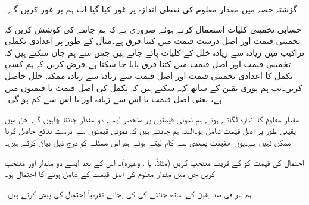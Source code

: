 گزشتہ حصہ میں مقدار معلوم کی نقطی اندازہ پر غور کیا گیا۔اب ہم  پر غور کریں گے۔

حسابی تخمینی کلیات استعمال کرتے ہوئے ضروری ہے کہ ہم جاننے کی کوشش کریں کہ  تخمینی قیمت اور اصل درست قیمت میں کتنا فرق ہے۔مثال کے طور پر اعدادی تکملی تراکیب میں زیادہ سے زیادہ خلل کے کلیات پائے جاتے ہیں جس سے ہم جان سکتے ہیں کہ تخمینی قیمت اور  اصل قیمت میں کتنا فرق پایا جا سکتا ہے۔فرض کریں کہ ہم کسی تکمل کا اعدادی تخمینی قیمت   اور اصل قیمت سے زیادہ سے زیادہ ممکنہ خلل  حاصل کریں۔تب ہم پوری یقین کے ساتھ کہہ سکتے ہیں کہ تکمل کی اصل قیمت  تا   قیمتوں میں  ہے، یعنی اصل قیمت   یا اس سے زیادہ اور   یا اس سے کم ہو گی۔

مقدار معلوم  کا اندازہ  لگاتے ہوئے ہم نمونی قیمتوں پر منحصر ایسے دو مقدار جاننا چاہیں گے جن میں یقینی طور پر اصل قیمت شامل ہو۔البتہ ہم جانتے ہیں کہ نمونی قیمتوں سے   درست نتائج حاصل کرنا ممکن نہیں ہے۔یوں حقیقت پسندی سے کام  لیتے ہوئے ہم اس مسئلے کو درج ذیل بیان کرتے ہیں۔

احتمال  کی قیمت کو  کے قریب منتخب کریں (مثلاً،  یا ، وغیرہ)۔ اس کے بعد ایسے  دو مقدار  اور  منتخب کریں جن میں مقدار معلوم  کی اصل قیمت کے شامل ہونے کا احتمال  ہو۔

ہم سو فی صد یقین کے ساتھ جاننے کی  کی بجائے تقریباً  احتمال کی  پیش کرتے ہیں۔

